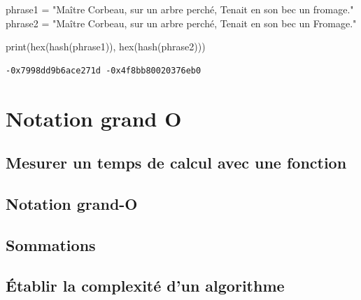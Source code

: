 \documentclass[
  letterpaper,
]{scrbook}
\newenvironment{Shaded}{\begin{snugshade}}{\end{snugshade}}
\newcommand{\BuiltInTok}[1]{\textcolor[rgb]{0.00,0.50,0.00}{#1}}
\newcommand{\NormalTok}[1]{\textcolor[rgb]{0.00,0.44,0.13}{#1}}
\newcommand{\OperatorTok}[1]{\textcolor[rgb]{0.40,0.40,0.40}{#1}}
\newcommand{\StringTok}[1]{\textcolor[rgb]{0.25,0.44,0.63}{#1}}
\theoremstyle{plain}
\theoremstyle{definition}
\theoremstyle{definition}
\theoremstyle{remark}
\begin{document}
\hypertarget{fonction-hachage-renard-corbeau}{}
\begin{Shaded}
\begin{Highlighting}[]
\NormalTok{phrase1 }\OperatorTok{=} \StringTok{"Maître Corbeau, sur un arbre perché, Tenait en son bec un fromage."}
\NormalTok{phrase2 }\OperatorTok{=} \StringTok{"Maître Corbeau, sur un arbre perché, Tenait en son bec un Fromage."}

\BuiltInTok{print}\NormalTok{(}\BuiltInTok{hex}\NormalTok{(}\BuiltInTok{hash}\NormalTok{(phrase1)), }\BuiltInTok{hex}\NormalTok{(}\BuiltInTok{hash}\NormalTok{(phrase2)))}
\end{Highlighting}
\end{Shaded}

\begin{verbatim}
-0x7998dd9b6ace271d -0x4f8bb80020376eb0
\end{verbatim}


\hypertarget{notation-grand-o}{%
\chapter{Notation grand O}\label{notation-grand-o}}

\hypertarget{mesurer-un-temps-de-calcul-avec-une-fonction}{%
\section{Mesurer un temps de calcul avec une
fonction}\label{mesurer-un-temps-de-calcul-avec-une-fonction}}

\hypertarget{notation-grand-o-1}{%
\section{Notation grand-O}\label{notation-grand-o-1}}

\hypertarget{sommations}{%
\section{Sommations}\label{sommations}}

\hypertarget{uxe9tablir-la-complexituxe9-dun-algorithme}{%
\section{Établir la complexité d'un
algorithme}\label{uxe9tablir-la-complexituxe9-dun-algorithme}}
\end{document}
